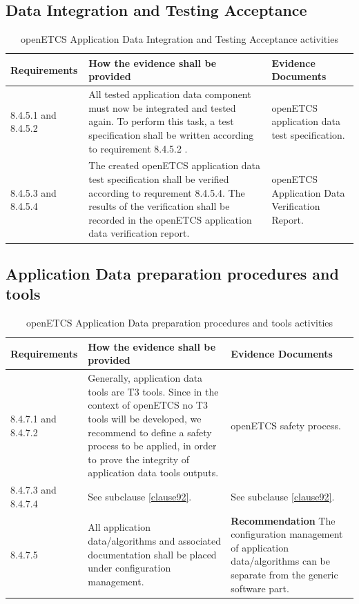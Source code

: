 \documentclass{template/openetcs_report}
\begin{document}
\subsection{Data Integration and Testing Acceptance}
{\footnotesize\sffamily\centering
\begin{longtable}{|p{2cm}|p{9cm}|p{3cm}|}
\caption{openETCS Application Data Integration and Testing Acceptance activities}\\
\hline
\bfseries Requirements & \bfseries How the evidence shall be provided & \bfseries Evidence Documents\\
\hline
\hline
\endhead
\hline
\endfoot

8.4.5.1 and 8.4.5.2 & All tested application data component must now be integrated and tested again. To perform this task, a test specification shall be written according to requirement 8.4.5.2 . & openETCS application data test specification.\\ 
\hline
8.4.5.3 and 8.4.5.4 & The created openETCS application data test specification shall be verified according to requrement 8.4.5.4.
The results of the verification shall be recorded in the openETCS application data verification report. & openETCS Application Data Verification Report.\\ 
\hline
\end{longtable}}


\subsection{Application Data preparation procedures and tools}
{\footnotesize\sffamily\centering
\begin{longtable}{|p{2cm}|p{9cm}|p{3cm}|}
\caption{openETCS Application Data preparation procedures and tools activities}\\
\hline
\bfseries Requirements & \bfseries How the evidence shall be provided & \bfseries Evidence Documents\\
\hline
\hline
\endhead
\hline
\endfoot

8.4.7.1 and 8.4.7.2 & Generally, application data tools are T3 tools.
Since in the context of openETCS no T3 tools will be developed, we recommend to define a safety process to be applied, in order to prove the integrity of application data tools outputs. & openETCS safety process.\\ 
\hline
8.4.7.3 and 8.4.7.4 & See subclause \ref{clause92}. & See subclause \ref{clause92}.\\ 
\hline
8.4.7.5 & All application data/algorithms and associated documentation shall be placed under configuration management. & \textbf{Recommendation} \linebreak
The configuration management of application data/algorithms can be separate from the generic software part.\\ 
\hline
\end{longtable}}
\end{document}
